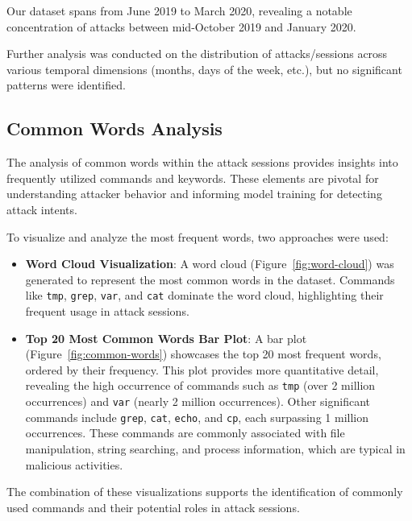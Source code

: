         Our dataset spans from June 2019 to March 2020, revealing a notable concentration of attacks between mid-October 2019 and January 2020.

        Further analysis was conducted on the distribution of attacks/sessions across various temporal dimensions (months, days of the week, etc.), but no significant patterns were identified.
        

    \subsection{Common Words Analysis}
    
        The analysis of common words within the attack sessions provides insights into frequently utilized commands and keywords. These elements are pivotal for understanding attacker behavior and informing model training for detecting attack intents. 

        To visualize and analyze the most frequent words, two approaches were used: 
        

        \begin{itemize}
            \item \textbf{Word Cloud Visualization}: A word cloud (Figure~\ref{fig:word-cloud}) was generated to represent the most common words in the dataset. Commands like \texttt{tmp}, \texttt{grep}, \texttt{var}, and \texttt{cat} dominate the word cloud, highlighting their frequent usage in attack sessions.

            \item \textbf{Top 20 Most Common Words Bar Plot}: A bar plot (Figure~\ref{fig:common-words}) showcases the top 20 most frequent words, ordered by their frequency. This plot provides more quantitative detail, revealing the high occurrence of commands such as \texttt{tmp} (over 2 million occurrences) and \texttt{var} (nearly 2 million occurrences). Other significant commands include \texttt{grep}, \texttt{cat}, \texttt{echo}, and \texttt{cp}, each surpassing 1 million occurrences. These commands are commonly associated with file manipulation, string searching, and process information, which are typical in malicious activities.
        \end{itemize}

        The combination of these visualizations supports the identification of commonly used commands and their potential roles in attack sessions. 

